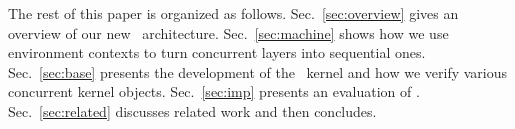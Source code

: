 {The rest of this paper is organized as follows.
Sec.~\ref{sec:overview} gives an overview of our new
\CTOS\ architecture. Sec.~\ref{sec:machine} shows how we use
environment contexts to turn concurrent layers into sequential ones. 
Sec.~\ref{sec:base} presents the development of the
\mCTOS\ kernel and how we verify various concurrent kernel
objects. Sec.~\ref{sec:imp} presents an evaluation of \CTOS. 
Sec.~\ref{sec:related} discusses related work and then concludes.
}




